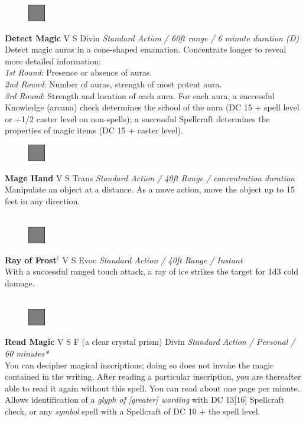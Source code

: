 \documentclass[letterpaper]{article}
\newcommand{\spell}[7]{
\begin{figure}
\vspace{-13pt}
\ifstrequal{#2}{Full}{  \includegraphics[width=2em]{Checkbox-Full}}{
\ifstrequal{#2}{Scroll}{\includegraphics[width=2em]{Checkbox-S}}{
                        \includegraphics[width=2em]{Checkbox}}}
\ifstrequal{#7}{}{\vspace{-1em}}{\vspace{#7}}
\end{figure}
\noindent \textbf{#1} #3 {
    \ifstrequal{#4}{Conj}{\color{Plum}Conj}{%
    \ifstrequal{#4}{Divin}{\color{YellowOrange}Divin}{%
    \ifstrequal{#4}{Ench}{\color{VioletRed}Ench}{%
    \ifstrequal{#4}{Trans}{\color{LimeGreen}Trans}{%
    \ifstrequal{#4}{Evoc}{\color{RedOrange}Evoc}{%
    \ifstrequal{#4}{Illu}{\color{ProcessBlue}Illu}{%
    \ifstrequal{#4}{Abjur}{\color{CadetBlue}Abjur}{%
    \ifstrequal{#4}{Necro}{\color{Red}Necro}{%
}}}}}}}}}
{\footnotesize \emph{#5}} \\
#6
}
\begin{document}

\spell{Detect Magic}{Full}{V S}{Divin}{Standard Action / 60ft range / 6 minute duration (D)}{
Detect magic auras in a cone-shaped emanation.  Concentrate longer to reveal more detailed information:\\
\emph{1st Round}: Presence or absence of auras.\\
\emph{2nd Round}: Number of auras, strength of most potent aura.\\
\emph{3rd Round}: Strength and location of each aura.  For each aura, a successful Knowledge (arcana) check determines the school of the aura (DC 15 + spell level or +1/2 caster level on non-spells); a successful Spellcraft determines the properties of magic items (DC 15 + caster level).}{3em} %



\spell{Mage Hand}{Full}{V S}{Trans}{Standard Action / 40ft Range / concentration duration}{%
Manipulate an object at a distance. As a move action, move the object up to 15 feet in any direction.\\}{}\\[-2em] %

\spell{Ray of Frost$^\dag$}{Full}{V S}{Evoc}{Standard Action / 40ft Range / Instant}{
With a successful ranged touch attack, a ray of ice strikes the target for 1d3 cold damage.\\}{}\\[-2em] %

\spell{Read Magic}{Full}{V S F (a clear crystal prism)}{Divin}{Standard Action / Personal / 60 minutes*}{
You can decipher magical inscriptions; doing so does not invoke the magic contained in the writing.  After reading a particular inscription, you are thereafter able to read it again without this spell.  You can read about one page per minute. Allows identification of a \emph{glyph of [greater] warding} with DC 13[16] Spellcraft check, or any \emph{symbol} spell with a Spellcraft of DC 10 + the spell level.}{1em}\\[-2em] %
\end{document}
